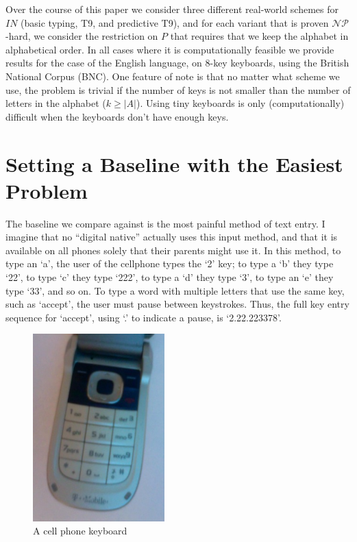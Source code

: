 \documentclass{article}
\newcommand{\NP}{\ensuremath{\mathcal{NP}}}
\begin{document}
Over the course of this paper we consider three different real-world
schemes for $IN$ (basic typing, T9, and predictive T9), and for each
variant that is proven \NP-hard, we consider the restriction on $P$ that
requires that we keep the alphabet in alphabetical order.  In all cases
where it is computationally feasible we provide results for the case of
the English language, on 8-key keyboards, using the British National
Corpus\cite{bnc} (BNC).  One feature of note is that no matter what scheme we
use, the problem is trivial if the number of keys is not smaller than the
number of letters in the alphabet ($k \ge |A|$).  Using tiny keyboards is only
(computationally) difficult when the keyboards don't have enough keys.

\section{Setting a Baseline with the Easiest Problem}

The baseline we compare against is the most painful method of text entry.  I
imagine that no ``digital native'' actually uses this input method, and that it
is available on all phones solely that their parents might use it.  In this
method, to type an `a', the user of the cellphone types the `2' key; to type a
`b' they type `22', to type `c' they type `222', to type a `d' they type `3',
to type an `e' they type `33', and so on.  To type a word with multiple
letters that use the same key, such as `accept', the user must pause
between keystrokes.  Thus, the full key entry sequence for `accept', using
`.' to indicate a pause, is `2.22.223378'.

\begin{figure}
\includegraphics[width=2in]{phonekeys.jpg}
\caption{A cell phone keyboard}
\label{keypic}
\end{figure}
\end{document}
